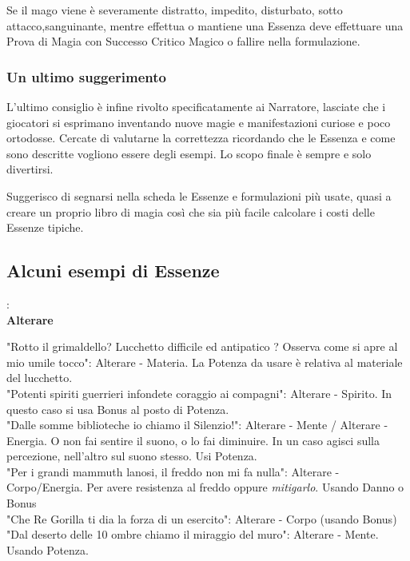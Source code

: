 \documentclass[a4paper,twoside,openany]{book}
\begin{document}
\begin{multicols}{2}
Se il mago viene è severamente distratto, impedito, disturbato, sotto attacco,sanguinante, mentre effettua o mantiene una Essenza deve effettuare una Prova di Magia con Successo Critico Magico o fallire nella formulazione.


\subsubsection{Un ultimo suggerimento}

L'ultimo consiglio è infine rivolto specificatamente ai Narratore, lasciate che i giocatori si esprimano inventando nuove magie e manifestazioni curiose e poco ortodosse. Cercate di valutarne la correttezza ricordando che le Essenza e come sono descritte vogliono essere degli esempi. Lo scopo finale è sempre e solo divertirsi.


\bigskip

Suggerisco di segnarsi nella scheda le Essenze e formulazioni più usate, quasi a creare un proprio libro di magia così che sia più facile calcolare i costi delle Essenze tipiche.

\bigskip



\subsection{Alcuni esempi di Essenze}:\\


\textbf{Alterare}

"Rotto il grimaldello? Lucchetto difficile ed antipatico ? Osserva come si apre al mio umile tocco": Alterare - Materia. La Potenza da usare è relativa al materiale del lucchetto.\\
"Potenti spiriti guerrieri infondete coraggio ai compagni": Alterare - Spirito. In questo caso si usa Bonus al posto di Potenza.\\
"Dalle somme biblioteche io chiamo il Silenzio!": Alterare - Mente / Alterare - Energia. O non fai sentire il suono, o lo fai diminuire. In un caso agisci sulla percezione, nell'altro sul suono stesso. Usi Potenza.\\
"Per i grandi mammuth lanosi, il freddo non mi fa nulla": Alterare - Corpo/Energia. Per avere resistenza al freddo oppure \emph{mitigarlo}. Usando Danno o Bonus\\
"Che Re Gorilla ti dia la forza di un esercito": Alterare - Corpo (usando Bonus)\\
"Dal deserto delle 10 ombre chiamo il miraggio del muro": Alterare - Mente. Usando Potenza.\\


\end{multicols}
\end{document}
